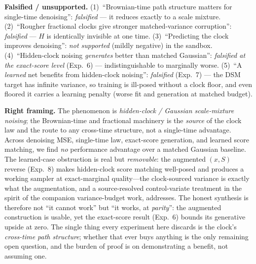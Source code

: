 \documentclass[11pt]{article}
\theoremstyle{definition}
\begin{document}
\textbf{Falsified / unsupported.} (1)~``Brownian-time path structure matters for
single-time denoising'': \emph{falsified} --- it reduces exactly to a scale
mixture. (2)~``Rougher fractional clocks give stronger matched-variance
corruption'': \emph{falsified} --- $H$ is identically invisible at one time.
(3)~``Predicting the clock improves denoising'': \emph{not supported} (mildly
negative) in the sandbox. (4)~``Hidden-clock noising \emph{generates} better
than matched Gaussian'': \emph{falsified at the exact-score level} (Exp.~6) ---
indistinguishable to marginally worse. (5)~``A \emph{learned} net benefits from
hidden-clock noising'': \emph{falsified} (Exp.~7) --- the DSM target has infinite
variance, so training is ill-posed without a clock floor, and even floored it
carries a learning penalty (worse fit and generation at matched budget).

\textbf{Right framing.} The phenomenon is \emph{hidden-clock / Gaussian
scale-mixture noising}; the Brownian-time and fractional machinery is the
\emph{source} of the clock law and the route to any cross-time structure, not a
single-time advantage. Across denoising MSE, single-time law, exact-score
generation, and learned score matching, we find \emph{no} performance advantage
over a matched Gaussian baseline. The learned-case obstruction is real but
\emph{removable}: the augmented $(x,S)$ reverse (Exp.~8) makes hidden-clock
score matching well-posed and produces a working sampler at exact-marginal
quality---the clock-sourced variance is exactly what the augmentation, and a
source-resolved control-variate treatment in the spirit of the companion
variance-budget work, addresses. The honest synthesis is therefore not ``it
cannot work'' but ``it works, at \emph{parity}'': the augmented construction is
usable, yet the exact-score result (Exp.~6) bounds its generative upside at
zero. The single thing every experiment here discards is the clock's
\emph{cross-time path structure}; whether that ever buys anything is the only
remaining open question, and the burden of proof is on demonstrating a benefit,
not assuming one.



\end{document}
